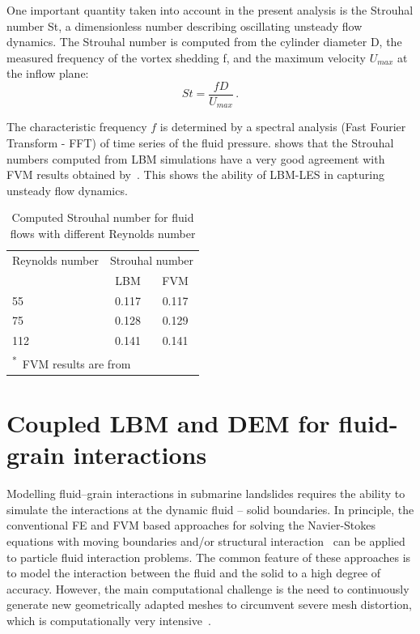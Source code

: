 One important quantity taken into account in the present analysis is the 
Strouhal number St, a dimensionless number describing oscillating unsteady 
flow dynamics. The Strouhal number is computed from the cylinder diameter D, 
the measured frequency of the vortex shedding f, and the maximum velocity 
$U_{max}$ at the inflow plane:
%
\begin{equation}
St=\frac{fD}{U_{max}}\,.
\end{equation}

\noindent The characteristic frequency $f$ is determined by a spectral 
analysis (Fast Fourier Transform - FFT) of time series of the fluid pressure. 
 shows that the Strouhal numbers computed from LBM 
simulations have a very good agreement with FVM results obtained 
by~\citet{Breuer2000}. This shows the ability of LBM-LES in capturing unsteady 
flow dynamics.


\begin{table}[tbhp]
	\caption{Computed Strouhal number for fluid flows with different Reynolds 
	number}
	\label{table:strouhal}
	\centering
	\begin{tabular}{l c c}
		\toprule
		Reynolds number & \multicolumn{2}{c}{Strouhal number} \\
		\cmidrule{2-3}
		& LBM & FVM \\
		\midrule
		55		& 0.117	 &	0.117 \\
		75		& 0.128	 &	0.129 \\
		112		& 0.141  &	0.141 \\
		\bottomrule
		\multicolumn{3}{l}{\footnotesize{\textsuperscript{*}~FVM results are 
		from~\citet{Breuer2000}}}
	\end{tabular}
\end{table}




\section{Coupled LBM and DEM for fluid-grain interactions}
\label{sec:coupled_lbm_dem}
Modelling fluid--grain interactions in submarine landslides requires the 
ability to simulate the interactions at the dynamic fluid -- solid boundaries. 
In principle, the conventional FE and FVM based approaches for solving the 
Navier-Stokes equations with moving boundaries and/or structural 
interaction~\citep{Bathe2004} can be applied to particle fluid interaction 
problems. The common feature of these approaches is to model the interaction 
between the fluid and the solid to a high degree of accuracy. However, the main 
computational challenge is the need to continuously generate new geometrically 
adapted meshes to circumvent severe mesh distortion, which is computationally 
very intensive~\citep{Han2007a}. 

